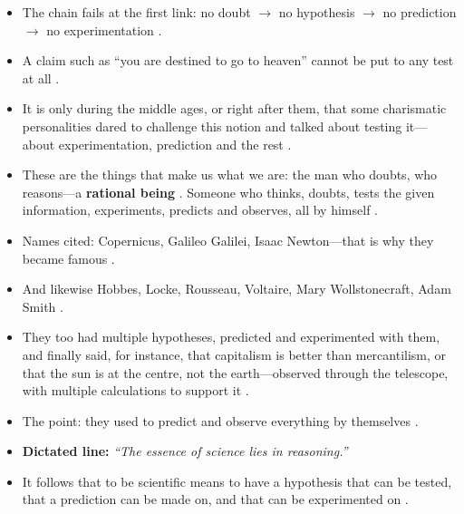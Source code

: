 \begin{CriticalPoint}
\begin{itemize}
    \item The chain fails at the first link: no doubt $\rightarrow$ no hypothesis $\rightarrow$ no prediction $\rightarrow$ no experimentation .
    \item A claim such as ``you are destined to go to heaven'' cannot be put to any test at all .
    \item It is only during the middle ages, or right after them, that some charismatic personalities dared to challenge this notion and talked about testing it---about experimentation, prediction and the rest .
    \item These are the things that make us what we are: the man who doubts, who reasons---a \textbf{rational being} . Someone who thinks, doubts, tests the given information, experiments, predicts and observes, all by himself .
\end{itemize}
\end{CriticalPoint}

\begin{ExampleBox}
\begin{itemize}
    \item Names cited: Copernicus, Galileo Galilei, Isaac Newton---that is why they became famous .
    \item And likewise Hobbes, Locke, Rousseau, Voltaire, Mary Wollstonecraft, Adam Smith .
    \item They too had multiple hypotheses, predicted and experimented with them, and finally said, for instance, that capitalism is better than mercantilism, or that the sun is at the centre, not the earth---observed through the telescope, with multiple calculations to support it .
    \item The point: they used to predict and observe everything by themselves .
\end{itemize}
\end{ExampleBox}

\begin{KeyConcept}
\begin{itemize}
    \item \textbf{Dictated line:} \textit{``The essence of science lies in reasoning.''} 
    \item It follows that to be scientific means to have a hypothesis that can be tested, that a prediction can be made on, and that can be experimented on .
\end{itemize}
\end{KeyConcept}

